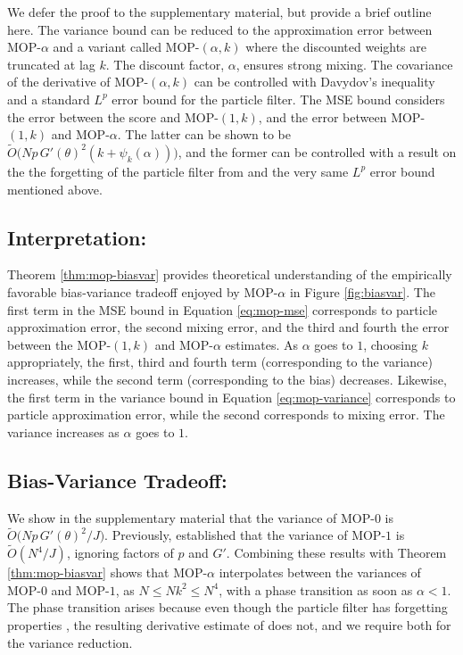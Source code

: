 \documentclass[numsec,webpdf,modern,medium,namedate]{oup-authoring-template}
\newcommand\arxiv[2]{#2} %
\theoremstyle{thmstyleone}%
\theoremstyle{thmstyletwo}%
\theoremstyle{thmstylethree}%
\begin{document}
We defer the proof to \arxiv{Appendix~\ref{appendix:biasvar}}{the supplementary material}, but provide a brief outline here. 
The variance bound can be reduced to the approximation error between MOP-$\alpha$ and a variant called MOP-$(\alpha,k)$ where the discounted weights are truncated at lag $k$. 
The discount factor, $\alpha$, ensures strong mixing.
The covariance of the derivative of MOP-$(\alpha,k)$ can be controlled with Davydov's inequality and a standard $L^p$ error bound for the particle filter. 
The MSE bound considers the error between the score and MOP-$(1,k)$, and the error between MOP-$(1,k)$ and MOP-$\alpha$. 
The latter can be shown to be $\tilde{O}\big(Np \, G'(\theta)^2(k+\psi_k(\alpha))\big)$, and the former can be controlled with a result on the the forgetting of the particle filter from \cite{karjalainen23} and the very same $L^p$ error bound mentioned above. 

\arxiv{}{\vspace*{-1mm}}
\subsection{Interpretation:} Theorem \ref{thm:mop-biasvar} provides theoretical understanding of the empirically favorable bias-variance tradeoff enjoyed by MOP-$\alpha$ in Figure \ref{fig:biasvar}.
The first term in the MSE bound in Equation \ref{eq:mop-mse} corresponds to particle approximation error, the second mixing error, and the third and fourth the error between the MOP-$(1,k)$ and MOP-$\alpha$ estimates. 
As $\alpha$ goes to $1$, choosing $k$ appropriately, the first, third and fourth term (corresponding to the variance) increases, while the second term (corresponding to the bias) decreases. 
Likewise, the first term in the variance bound in Equation \ref{eq:mop-variance} corresponds to particle approximation error, while the second corresponds to mixing error. 
The variance increases as $\alpha$ goes to $1$. 

\arxiv{}{\vspace*{-1mm}}
\subsection{Bias-Variance Tradeoff:} We show in \arxiv{Appendix~\ref{appendix:biasvar}}{the supplementary material} that the variance of MOP-$0$ is $\tilde{O}\big( Np \, G'(\theta)^2\big/J \big)$.
Previously, \cite{poyiadjis11} established that the variance of MOP-$1$ is $\tilde{O}(N^4/J)$, ignoring factors of $p$ and $G'$. 
Combining these results with Theorem \ref{thm:mop-biasvar} shows that MOP-$\alpha$ interpolates between the variances of MOP-$0$ and MOP-$1$, as $N \leq Nk^2 \leq N^4$, with a phase transition as soon as $\alpha<1$. 
The phase transition arises because even though the particle filter has forgetting properties \citep{karjalainen23}, the resulting derivative estimate of \cite{poyiadjis11} does not, and we require both for the variance reduction. 
\end{document}
